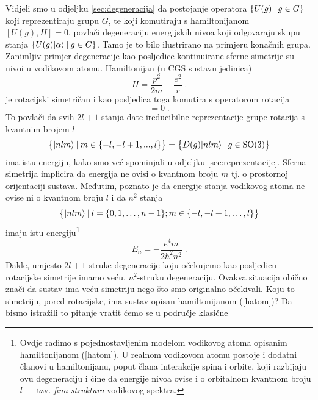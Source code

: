 Vidjeli smo u odjeljku \ref{sec:degeneracija} da postojanje operatora
$\{U(g) \: | \: g\in G \}$ koji reprezentiraju grupu $G$, te koji
komutiraju s hamiltonijanom $[U(g), H] = 0$, povlači degeneraciju
energijskih nivoa koji odgovaraju skupu stanja $\{U(g)| \alpha \rangle \: | \: g\in
G \}$. Tamo je to bilo ilustrirano na primjeru konačnih grupa. Zanimljiv
primjer degeneracije kao posljedice kontinuirane sferne simetrije su
nivoi u vodikovom atomu. Hamiltonijan (u CGS sustavu jedinica)
\begin{equation}
    H = \frac{p^2}{2m} - \frac{e^2}{r} \;.
\label{hatom}
\end{equation}
je rotacijski simetričan i kao posljedica toga komutira s operatorom
rotacija
\begin{equation}
     [H, D(\vec{n},\phi)] = 0 \;.
\end{equation}
To povlači da svih $2l+1$ stanja date ireducibilne reprezentacije
grupe rotacija s kvantnim brojem $l$
\begin{equation}
   \big\{| nlm \rangle \: | \: m\in\{-l, -l+1, ..., l \}\big\} = 
   \big\{ D(g)| nlm \rangle \: | \: g \in \mathrm{SO}(3) \big\}
\end{equation}
ima istu energiju, kako smo već spominjali u odjeljku \ref{sec:reprezentacije}.
Sferna simetrija implicira da energija ne ovisi o kvantnom broju $m$
tj. o prostornoj orijentaciji sustava.
Međutim, poznato je da energije stanja vodikovog atoma ne
ovise ni o kvantnom broju $l$ i da $n^2$ stanja
\begin{equation}
\big\{| nlm \rangle \: | \: l=\{0, 1, \ldots, n-1\}; m\in\{-l, -l+1, \ldots, l \}\big\} 
\end{equation}
imaju istu energiju\footnote{Ovdje radimo s pojednostavljenim modelom vodikovog atoma
opisanim hamiltonijanom (\protect\ref{hatom}). U realnom vodikovom atomu
postoje i dodatni članovi u hamiltonijanu, poput člana interakcije spina
i orbite, koji razbijaju ovu degeneraciju i čine da energije nivoa ovise
i o orbitalnom kvantnom broju $l$ --- tzv. \emph{fina struktura} vodikovog
spektra.}
\begin{equation}
    E_n = - \frac{e^4 m}{2 \hbar^2 n^2}  \;.
\end{equation}
Dakle, umjesto $2l+1$-struke degeneracije koju očekujemo kao posljedicu
rotacijske simetrije imamo veću, $n^2$-struku degeneraciju. Ovakva
situacija obično znači da sustav ima veću simetriju nego što smo
originalno očekivali. Koju to simetriju, pored rotacijske, ima
sustav opisan hamiltonijanom (\ref{hatom})?
Da bismo istražili to pitanje vratit ćemo se u područje klasične
